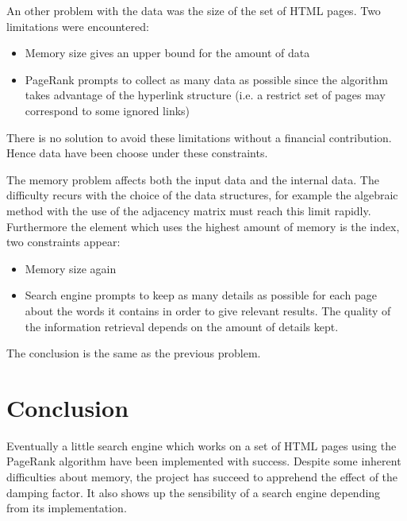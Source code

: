 \documentclass[pdftex,12pt,a4paper]{article}
\begin{document}
An other problem with the data was the size of the set of HTML pages. Two limitations were encountered:
\begin{itemize}
\item Memory size gives an upper bound for the amount of data
\item PageRank prompts to collect as many data as possible since the algorithm takes advantage of the hyperlink structure (i.e. a restrict set of pages may correspond to some ignored links)
\end{itemize}
There is no solution to avoid these limitations without a financial contribution. Hence data have been choose under these constraints.

The memory problem affects both the input data and the internal data. The difficulty recurs with the choice of the data structures, for example the algebraic method with the use of the adjacency matrix must reach this limit rapidly. Furthermore the element which uses the highest amount of memory is the index, two constraints appear:
\begin{itemize}
\item Memory size again
\item Search engine prompts to keep as many details as possible for each page about the words it contains in order to give relevant results. The quality of the information retrieval depends on the amount of details kept.
\end{itemize}
The conclusion is the same as the previous problem.


\section{Conclusion}

Eventually a little search engine which works on a set of HTML pages using the PageRank algorithm have been implemented with success. Despite some inherent difficulties about memory, the project has succeed to apprehend the effect of the damping factor. It also shows up the sensibility of a search engine depending from its implementation.
\end{document}
